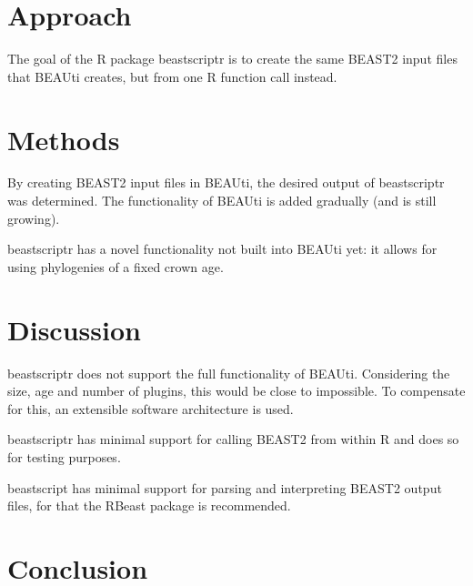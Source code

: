 \documentclass{article}
\begin{document}
\section{Approach}

The goal of the R package beastscriptr is to create the 
same BEAST2 input files that BEAUti creates, but from one R function call 
instead.

\section{Methods}

By creating BEAST2 input files in BEAUti, 
the desired output of beastscriptr was determined. 
The functionality of BEAUti is added gradually (and is still growing).

beastscriptr has a novel functionality not built into BEAUti yet:
it allows for using phylogenies of a fixed crown age. 

\section{Discussion}

beastscriptr does not support the full functionality of BEAUti. Considering
the size, age and number of plugins, this would be close to impossible.
To compensate for this, an extensible software architecture is used.

beastscriptr has minimal support for calling BEAST2 from within R and does
so for testing purposes. 

beastscript has minimal support for parsing and interpreting BEAST2 output files,
for that the RBeast package is recommended.

\section{Conclusion}
\end{document}
